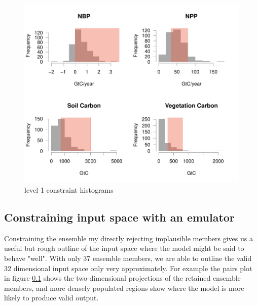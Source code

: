\documentclass[gmd, manuscript]{copernicus}
\begin{document}
\begin{figure}[t]
\includegraphics[width=12cm]{./graphics/level_2_constraints_hists.pdf}
\caption{level 1 constraint histograms}
\label{fig:level_2_constraints_hists}
\end{figure}


\subsection{Constraining input space with an emulator}

Constraining the ensemble my directly rejecting implausible members gives us a useful but rough outline of the input space where the model might be said to behave "well". With only 37 ensemble members, we are able to outline the valid 32 dimensional input space only very approximately. For example the pairs plot in figure \ref{} shows the two-dimensional projections of the retained ensemble members, and more densely populated regions show where the model is more likely to produce valid output.
\end{document}
